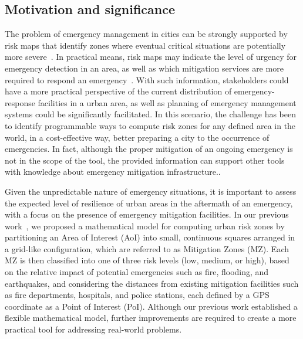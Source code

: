 \begin{refsection}
\section{Motivation and significance}

The problem of emergency management in cities can be strongly supported by risk maps that identify zones where eventual critical situations are potentially more severe~\cite{mapping1}. In practical means, risk maps may indicate the level of urgency for emergency detection in an area, as well as which mitigation services are more required to respond an emergency~\cite{surveyemergencies1}. With such information, stakeholders could have a more practical perspective of the current distribution of emergency-response facilities in a urban area, as well as planning of emergency management systems could be significantly facilitated. In this scenario, the challenge has been to identify programmable ways to compute risk zones for any defined area in the world, in a cost-effective way, better preparing a city to the occurrence of emergencies. In fact, although the proper mitigation of an ongoing emergency is not in the scope of the tool, the provided information can support other tools with knowledge about emergency mitigation infrastructure..

Given the unpredictable nature of emergency situations, it is important to assess the expected level of resilience of urban areas in the aftermath of an emergency, with a focus on the presence of emergency mitigation facilities. In our previous work~\cite{riskzones}, we proposed a mathematical model for computing urban risk zones by partitioning an Area of Interest (AoI) into small, continuous squares arranged in a grid-like configuration, which are referred to as Mitigation Zones (MZ). Each MZ is then classified into one of three risk levels (low, medium, or high), based on the relative impact of potential emergencies such as fire, flooding, and earthquakes, and considering the distances from existing mitigation facilities such as fire departments, hospitals, and police stations, each defined by a GPS coordinate as a Point of Interest (PoI). Although our previous work established a flexible mathematical model, further improvements are required to create a more practical tool for addressing real-world problems.


\end{refsection}

